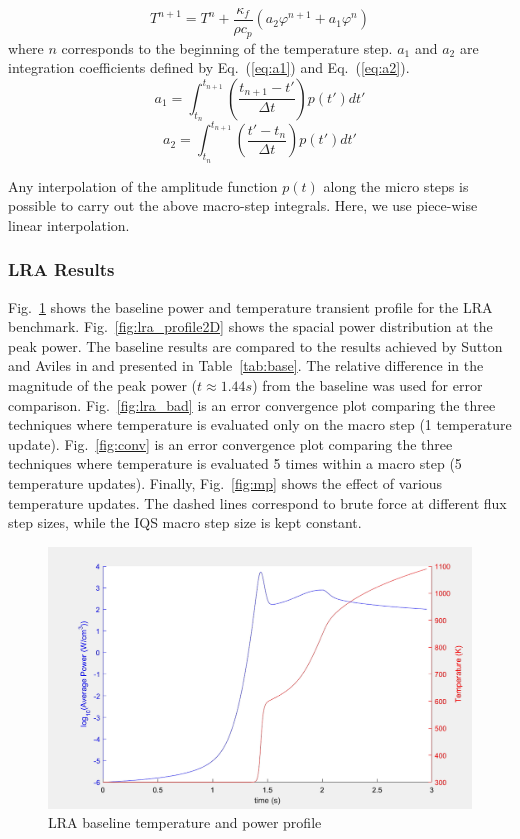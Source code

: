 \documentclass{anstrans}
\newcommand{\eqt}[1]{Eq.~(\ref{#1})}                     %
\newcommand{\fig}[1]{Fig.~\ref{#1}}                      %
\newcommand{\tbl}[1]{Table~\ref{#1}}                     %
\newcommand{\be}{\begin{equation}}
\newcommand{\ee}{\end{equation}}
\begin{document}
\be
T^{n+1} = T^n + \frac{\kappa_f}{\rho c_p} \left(a_2 \varphi^{n+1} + a_1 \varphi^{n}\right)
\label{eq:temp_an}
\ee
where $n$ corresponds to the beginning of the temperature step.  $a_1$ and $a_2$ are integration coefficients defined by \eqt{eq:a1} and \eqt{eq:a2}.
\be
a_1 = \int_{t_n}^{t_{n+1}}\left(\frac{t_{n+1}-t'}{\Delta t}\right)p(t')dt'
\label{eq:a1}
\ee
\be
a_2 = \int_{t_n}^{t_{n+1}}\left(\frac{t'-t_n}{\Delta t}\right)p(t')dt'
\label{eq:a2}
\ee

Any interpolation of the amplitude function $p(t)$ along the micro steps is possible to carry out the above macro-step integrals. Here, we use piece-wise linear interpolation.

\subsubsection{LRA Results}

\fig{fig:lra_profile} shows the baseline power and temperature transient profile for the LRA benchmark. \fig{fig:lra_profile2D} shows the spacial power distribution at the peak power.  The baseline results are compared to the results achieved by Sutton and Aviles in \cite{Sutton_1996} and presented in \tbl{tab:base}.  The relative difference in the magnitude of the peak power ($t\approx1.44 s$) from the baseline was used for error comparison.  \fig{fig:lra_bad} is an error convergence plot comparing the three techniques where temperature is evaluated only on the macro step (1 temperature update).  \fig{fig:conv} is an error convergence plot comparing the three techniques where temperature is evaluated 5 times within a macro step (5 temperature updates).  Finally, \fig{fig:mp} shows the effect of various temperature updates. The dashed lines correspond to brute force at different flux step sizes, while the IQS macro step size is kept constant. \\

\begin{figure}[htbp!]
\centering
\includegraphics[width=\linewidth]{lra_profile.png}
\caption{LRA baseline temperature and power profile}
\label{fig:lra_profile}
\end{figure}
\end{document}

